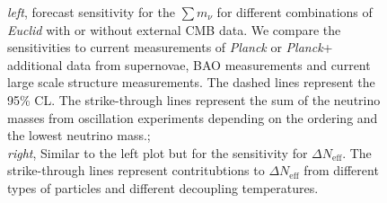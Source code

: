 \documentclass[a4paper,11pt]{article}
\newcommand{\euclid}{\textit{Euclid}\xspace}
\newcommand{\planck}{\textit{Planck}\xspace}
\newcommand{\dneff}{\Delta N_\mathrm{eff}}
\newcommand{\summnu}{\sum m_\nu}
\begin{document}
\begin{figure}[!htbp]
\begin{subfigure}{0.49\textwidth}
    \end{subfigure}
    \caption{\textit{left}, forecast sensitivity for the $\summnu$ for different combinations of \euclid with or without external CMB data. We compare the sensitivities to current measurements of \planck or \planck + additional data from supernovae, BAO measurements and current large scale structure measurements. The dashed lines represent the 95\% CL. The strike-through lines represent the sum of the neutrino masses from oscillation experiments depending on the ordering and the lowest neutrino mass.;\\
    \textit{right}, Similar to the left plot but for the sensitivity for $\dneff$. The strike-through lines represent contritubtions to $\dneff$ from different types of particles and different decoupling temperatures. 
    }
    \label{fig:results}
\end{figure}



\end{document}
